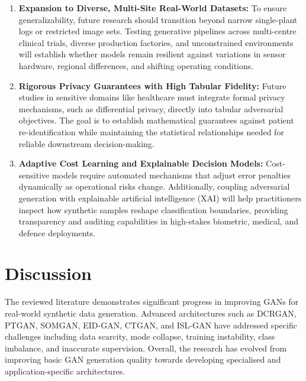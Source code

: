 \documentclass[12pt,a4paper]{article}
\begin{document}
\begin{enumerate}
    \item \textbf{Expansion to Diverse, Multi-Site Real-World Datasets:}
    To ensure generalizability, future research should transition beyond narrow single-plant logs or restricted image sets. Testing generative pipelines across multi-centre clinical trials, diverse production factories, and unconstrained environments will establish whether models remain resilient against variations in sensor hardware, regional differences, and shifting operating conditions.

    \item \textbf{Rigorous Privacy Guarantees with High Tabular Fidelity:}
    Future studies in sensitive domains like healthcare must integrate formal privacy mechanisms, such as differential privacy, directly into tabular adversarial objectives. The goal is to establish mathematical guarantees against patient re-identification while maintaining the statistical relationships needed for reliable downstream decision-making.

    \item \textbf{Adaptive Cost Learning and Explainable Decision Models:}
    Cost-sensitive models require automated mechanisms that adjust error penalties dynamically as operational risks change. Additionally, coupling adversarial generation with explainable artificial intelligence (XAI) will help practitioners inspect how synthetic samples reshape classification boundaries, providing transparency and auditing capabilities in high-stakes biometric, medical, and defence deployments.
\end{enumerate}


\section{Discussion}

The reviewed literature demonstrates significant progress in improving GANs for real-world synthetic data generation. Advanced architectures such as DCRGAN, PTGAN, SOMGAN, EID-GAN, CTGAN, and ISL-GAN have addressed specific challenges including data scarcity, mode collapse, training instability, class imbalance, and inaccurate supervision. Overall, the research has evolved from improving basic GAN generation quality towards developing specialised and application-specific architectures.
\end{document}
